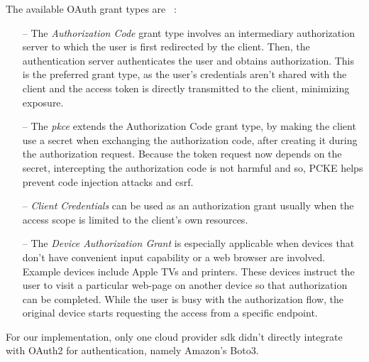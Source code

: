 The available OAuth grant types are ~\cite{oauth, oauth_grants}:

\begin{itemize}
	\item [--]The \textit{Authorization Code} grant type involves an intermediary authorization server to which the user is first redirected by the client. Then, the authentication server authenticates the user and obtains authorization. This is the preferred grant type, as the user's credentials aren't shared with the client and the access token is directly transmitted to the client, minimizing exposure. 
	
	\item [--] The \textit{\ac{pkce}} extends the Authorization Code grant type, by making the client use a secret when exchanging the authorization code, after creating it during the authorization request. Because the token request now depends on the secret, intercepting the authorization code is not harmful and so, PCKE helps prevent code injection attacks and \ac{csrf}.
	
	\item [--] \textit{Client Credentials} can be used as an authorization grant usually when the access scope is limited to the client's own resources. 
	
	\item [--] The \textit{Device Authorization Grant} is especially applicable when devices that don't have convenient input capability or a web browser are involved. Example devices include Apple TVs and printers. These devices instruct the user to visit a particular web-page on another device so that authorization can be completed. While the user is busy with the authorization flow, the original device starts requesting the access from a specific endpoint.
\end{itemize}

For our implementation, only one cloud provider \ac{sdk} didn't directly integrate with OAuth2 for authentication, namely Amazon's Boto3.
